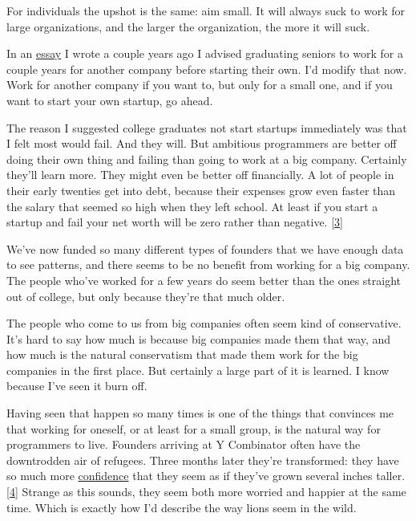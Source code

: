 For individuals the upshot is the same:
                    aim small. It will always suck to work for large
                    organizations, and the larger the organization, the more it
                    will suck.

In an \href{http://www.paulgraham.com/start.html}{essay} I
                    wrote a couple years ago I advised graduating seniors to
                    work for a couple years for another company before starting
                    their own. I'd modify that now. Work for another company if
                    you want to, but only for a small one, and if you want to
                    start your own startup, go ahead.

The reason I
                    suggested college graduates not start startups immediately
                    was that I felt most would fail. And they will. But
                    ambitious programmers are better off doing their own thing
                    and failing than going to work at a big company. Certainly
                    they'll learn more. They might even be better off
                    financially. A lot of people in their early twenties get
                    into debt, because their expenses grow even faster than the
                    salary that seemed so high when they left school. At least
                    if you start a startup and fail your net worth will be zero
                    rather than negative.
                    [\href{\#f3n}{3}]

We've now funded so many different types of
                    founders that we have enough data to see patterns, and there
                    seems to be no benefit from working for a big company. The
                    people who've worked for a few years do seem better than the
                    ones straight out of college, but only because they're that
                    much older.

The people who come to us from big
                    companies often seem kind of conservative. It's hard to say
                    how much is because big companies made them that way, and
                    how much is the natural conservatism that made them work for
                    the big companies in the first place. But certainly a large
                    part of it is learned. I know because I've seen it burn
                    off.

Having seen that happen so many times is one
                    of the things that convinces me that working for oneself, or
                    at least for a small group, is the natural way for
                    programmers to live. Founders arriving at Y Combinator often
                    have the downtrodden air of refugees. Three months later
                    they're transformed: they have so much more
                    \href{http://paulmckellar.com/photos/03l}{confidence}
                    that they seem as if they've grown several inches taller.
                    [\href{\#f4n}{4}]
                    Strange as this sounds, they seem both more worried and
                    happier at the same time. Which is exactly how I'd describe
                    the way lions seem in the wild.

